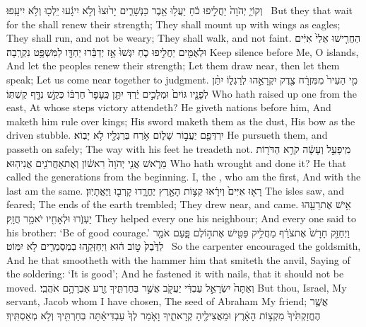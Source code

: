 {וְקוֹיֵ֤ יְהֹוָה֙ יַחֲלִ֣יפוּ כֹ֔חַ יַעֲל֥וּ אֵ֖בֶר כַּנְּשָׁרִ֑ים יָר֙וּצוּ֙ וְלֹ֣א יִיגָ֔עוּ יֵלְכ֖וּ וְלֹ֥א יִיעָֽפוּ׃ \setuma }
{But they that wait for the \lord\space shall renew their strength; They shall mount up with wings as eagles; They shall run, and not be weary; They shall walk, and not faint.}
\newperek
{}
{הַחֲרִ֤ישׁוּ אֵלַי֙ אִיִּ֔ים וּלְאֻמִּ֖ים יַחֲלִ֣יפוּ כֹ֑חַ יִגְּשׁוּ֙ אָ֣ז יְדַבֵּ֔רוּ יַחְדָּ֖ו לַמִּשְׁפָּ֥ט נִקְרָֽבָה׃}
{Keep silence before Me, O islands, And let the peoples renew their strength; Let them draw near, then let them speak; Let us come near together to judgment.}
{מִ֤י הֵעִיר֙ מִמִּזְרָ֔ח צֶ֖דֶק יִקְרָאֵ֣הוּ לְרַגְל֑וֹ יִתֵּ֨ן לְפָנָ֤יו גּוֹיִם֙ וּמְלָכִ֣ים יַ֔רְדְּ יִתֵּ֤ן כֶּֽעָפָר֙ חַרְבּ֔וֹ כְּקַ֥שׁ נִדָּ֖ף קַשְׁתּֽוֹ׃}
{Who hath raised up one from the east, At whose steps victory attendeth? He giveth nations before him, And maketh him rule over kings; His sword maketh them as the dust, His bow as the driven stubble.}
{יִרְדְּפֵ֖ם יַעֲב֣וֹר שָׁל֑וֹם אֹ֥רַח בְּרַגְלָ֖יו לֹ֥א יָבֽוֹא׃}
{He pursueth them, and passeth on safely; The way with his feet he treadeth not.}
{מִֽי\maqqaf פָעַ֣ל וְעָשָׂ֔ה קֹרֵ֥א הַדֹּר֖וֹת מֵרֹ֑אשׁ אֲנִ֤י יְהֹוָה֙ רִאשׁ֔וֹן וְאֶת\maqqaf אַחֲרֹנִ֖ים אֲנִי\maqqaf הֽוּא׃}
{Who hath wrought and done it? He that called the generations from the beginning. I, the \lord, who am the first, And with the last am the same.}
{רָא֤וּ אִיִּים֙ וְיִרָ֔אוּ קְצ֥וֹת הָאָ֖רֶץ יֶחֱרָ֑דוּ קָרְב֖וּ וַיֶּאֱתָיֽוּן׃}
{The isles saw, and feared; The ends of the earth trembled; They drew near, and came.}
{אִ֥ישׁ אֶת\maqqaf רֵעֵ֖הוּ יַעְזֹ֑רוּ וּלְאָחִ֖יו יֹאמַ֥ר חֲזָֽק׃}
{They helped every one his neighbour; And every one said to his brother: ‘Be of good courage.’}
{וַיְחַזֵּ֤ק חָרָשׁ֙ אֶת\maqqaf צֹרֵ֔ף מַחֲלִ֥יק פַּטִּ֖ישׁ אֶת\maqqaf ה֣וֹלֶם פָּ֑עַם אֹמֵ֤ר לַדֶּ֙בֶק֙ ט֣וֹב ה֔וּא וַיְחַזְּקֵ֥הוּ בְמַסְמְרִ֖ים לֹ֥א יִמּֽוֹט׃ \setuma }
{So the carpenter encouraged the goldsmith, And he that smootheth with the hammer him that smiteth the anvil, Saying of the soldering: ‘It is good’; And he fastened it with nails, that it should not be moved.}
{וְאַתָּה֙ יִשְׂרָאֵ֣ל עַבְדִּ֔י יַעֲקֹ֖ב אֲשֶׁ֣ר בְּחַרְתִּ֑יךָ זֶ֖רַע אַבְרָהָ֥ם אֹהֲבִֽי׃}
{But thou, Israel, My servant, Jacob whom I have chosen, The seed of Abraham My friend;}
{אֲשֶׁ֤ר הֶחֱזַקְתִּ֙יךָ֙ מִקְצ֣וֹת הָאָ֔רֶץ וּמֵאֲצִילֶ֖יהָ קְרָאתִ֑יךָ וָאֹ֤מַר לְךָ֙ עַבְדִּי\maqqaf אַ֔תָּה בְּחַרְתִּ֖יךָ וְלֹ֥א מְאַסְתִּֽיךָ׃}
